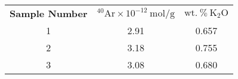 \documentclass[12pt]{article}    %
\begin{document}
\begin{center}
\begin{tabular}{c|c|c}
  \textbf{Sample Number} & $\boldsymbol{\mathrm{^{40}Ar \times 10^{-12}\ mol/g}}$ & $\boldsymbol{\mathrm{wt.\ \%\ K_2O}}$ \\
  1 & 2.91 & 0.657 \\
  2 & 3.18 & 0.755 \\
  3 & 3.08 & 0.680 \\
\end{tabular}
\end{center}





%



    
\end{document}
